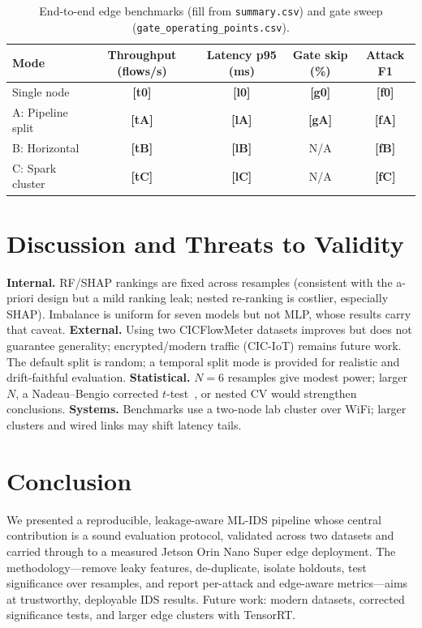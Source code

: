\documentclass[runningheads]{llncs}
\newcommand{\ph}[1]{{\color{red}\textbf{[#1]}}}
\begin{document}
\begin{table}[htbp]
  \caption{End-to-end edge benchmarks (fill from \texttt{summary.csv}) and gate sweep (\texttt{gate\_operating\_points.csv}).}
  \label{tab:gate}
  \centering\small
  \begin{tabular}{lcccc}
    \toprule Mode & Throughput (flows/s) & Latency p95 (ms) & Gate skip (\%) & Attack F1 \\ \midrule
    Single node & \ph{t0} & \ph{l0} & \ph{g0} & \ph{f0} \\
    A: Pipeline split & \ph{tA} & \ph{lA} & \ph{gA} & \ph{fA} \\
    B: Horizontal & \ph{tB} & \ph{lB} & N/A & \ph{fB} \\
    C: Spark cluster & \ph{tC} & \ph{lC} & N/A & \ph{fC} \\
    \bottomrule
  \end{tabular}
\end{table}

\section{Discussion and Threats to Validity}
\label{sec:threats}
\textbf{Internal.} RF/SHAP rankings are fixed across resamples (consistent with the a-priori design but a mild ranking leak; nested re-ranking is costlier, especially SHAP). Imbalance is uniform for seven models but not MLP, whose results carry that caveat.
\textbf{External.} Using two CICFlowMeter datasets improves but does not guarantee generality; encrypted/modern traffic (CIC-IoT) remains future work. The default split is random; a temporal split mode is provided for realistic and drift-faithful evaluation.
\textbf{Statistical.} $N{=}6$ resamples give modest power; larger $N$, a Nadeau--Bengio corrected $t$-test~\cite{nadeau2003inference}, or nested CV would strengthen conclusions.
\textbf{Systems.} Benchmarks use a two-node lab cluster over WiFi; larger clusters and wired links may shift latency tails.

\section{Conclusion}
We presented a reproducible, leakage-aware ML-IDS pipeline whose central contribution is a sound evaluation protocol, validated across two datasets and carried through to a measured Jetson Orin Nano Super edge deployment. The methodology---remove leaky features, de-duplicate, isolate holdouts, test significance over resamples, and report per-attack and edge-aware metrics---aims at trustworthy, deployable IDS results. Future work: modern datasets, corrected significance tests, and larger edge clusters with TensorRT.
\end{document}
